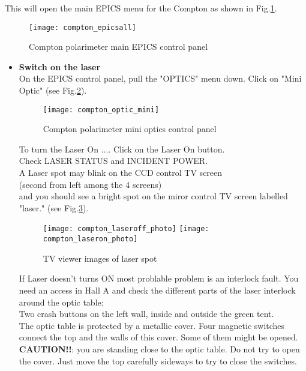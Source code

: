 {{This will open the main EPICS menu for the Compton as shown in Fig.\ref{fig:compton_epicsall}.
 \begin{figure}[htp]
    \begin{center}
        \texttt{[image: compton\_epicsall]}
    \end{center}
    \caption[compton:epics main control]{Compton polarimeter main EPICS control panel }
    \label{fig:compton_epicsall}
 \end{figure}


\begin{itemize}
\item {\bf Switch on the laser}\\

On the EPICS control panel, pull the "OPTICS" menu down. Click on "Mini Optic" 
(see Fig.\ref{fig:compton_optic_mini}).
\begin{figure}[htp]
    \begin{center}
        \texttt{[image: compton\_optic\_mini]}
     \end{center}
    \caption[compton:epics mini control]{Compton polarimeter mini optics control panel }
    \label{fig:compton_optic_mini}
 \end{figure}


To turn the Laser On .... Click on the Laser On button.\\
        Check LASER STATUS and INCIDENT POWER.\\
        A Laser spot may blink on the CCD control TV screen\\ 
	(second from left among the 4 screens)\\
        and you should see a bright spot on the miror control TV screen labelled "laser." 
	(see Fig.\ref{fig:compton_laser_photo}).
 \begin{figure}[htp]
    \begin{center}
        \texttt{[image: compton\_laseroff\_photo]}
        \texttt{[image: compton\_laseron\_photo]}
    \end{center}
    \caption[compton:laser spot]{TV viewer images of laser spot }
    \label{fig:compton_laser_photo}
 \end{figure}

        If Laser doesn't turns ON most problable problem is an interlock
        fault.
        You need an access in Hall A and check the different parts of the
        laser interlock around the optic table:\\
        Two crash buttons on the left wall, inside and outside the green
        tent.\\
        The optic table is protected by a metallic cover. Four magnetic switches connect the top and the walls
        of this cover. Some of them might be opened. {\bf CAUTION!!}: you are standing close to the optic table.
        Do not try to open the cover. Just move the top carefully sideways to try to close the switches.
	

\end{itemize}}}
